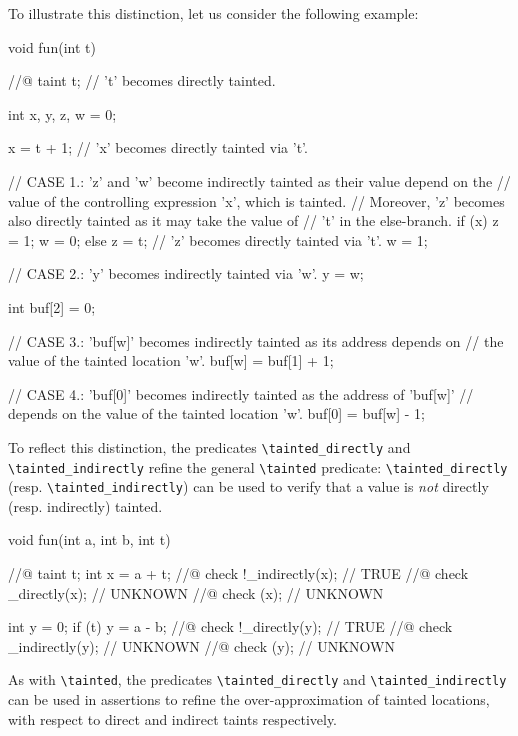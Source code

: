 \documentclass{frama-c-book}
\begin{document}
To illustrate this distinction, let us consider the following example:
\begin{listing-nonumber}
void fun(int t) {
  //@ taint t;                // 't' becomes directly tainted.

  int x, y, z, w = 0;

  x = t + 1;                  // 'x' becomes directly tainted via 't'.

  // CASE 1.: 'z' and 'w' become indirectly tainted as their value depend on the
  // value of the controlling expression 'x', which is tainted.
  // Moreover, 'z' becomes also directly tainted as it may take the value of
  // 't' in the else-branch.
  if (x) {
    z = 1;
    w = 0;
  }
  else {
    z = t;                    // 'z' becomes directly tainted via 't'.
    w = 1;
  }

  // CASE 2.: 'y' becomes indirectly tainted via 'w'.
  y = w;

  int buf[2] = {0};

  // CASE 3.: 'buf[w]' becomes indirectly tainted as its address depends on
  // the value of the tainted location 'w'.
  buf[w] = buf[1] + 1;

  // CASE 4.: 'buf[0]' becomes indirectly tainted as the address of 'buf[w]'
  // depends on the value of the tainted location 'w'.
  buf[0] = buf[w] - 1;
}
\end{listing-nonumber}

To reflect this distinction, the predicates \lstinline|\tainted_directly| and
\lstinline|\tainted_indirectly| refine the general \lstinline|\tainted|
predicate: \lstinline|\tainted_directly| (resp. \lstinline|\tainted_indirectly|)
can be used to verify that a value is \emph{not} directly (resp. indirectly)
tainted.

\begin{listing-nonumber}
  void fun(int a, int b, int t) {
    //@ taint t;
    int x = a + t;
    //@ check !\tainted_indirectly(x);  // TRUE
    //@ check \tainted_directly(x);     // UNKNOWN
    //@ check \tainted(x);              // UNKNOWN

    int y = 0;
    if (t)
      y = a - b;
    //@ check !\tainted_directly(y);    // TRUE
    //@ check \tainted_indirectly(y);   // UNKNOWN
    //@ check \tainted(y);              // UNKNOWN
  }
\end{listing-nonumber}

As with \lstinline|\tainted|, the predicates \lstinline|\tainted_directly| and
\lstinline|\tainted_indirectly| can be used in \acsl{} assertions to refine the
over-approximation of tainted locations, with respect to direct and indirect
taints respectively.
\end{document}

